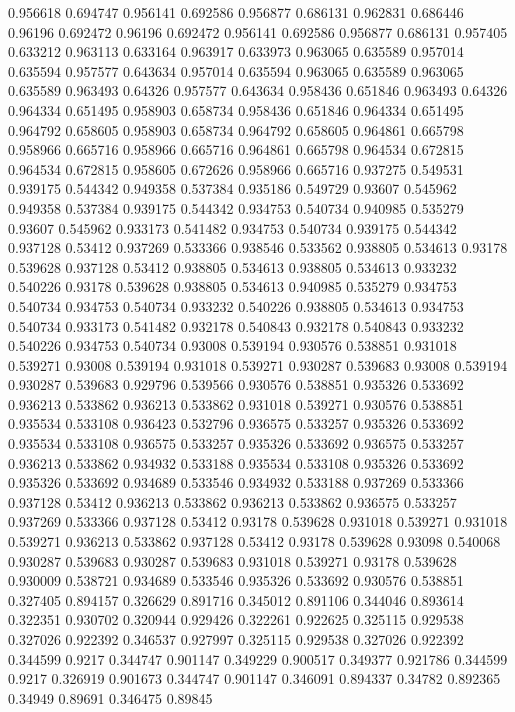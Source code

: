 0.956618 0.694747
0.956141 0.692586
0.956877 0.686131
0.962831 0.686446
0.96196 0.692472
0.96196 0.692472
0.956141 0.692586
0.956877 0.686131
0.957405 0.633212
0.963113 0.633164
0.963917 0.633973
0.963065 0.635589
0.957014 0.635594
0.957577 0.643634
0.957014 0.635594
0.963065 0.635589
0.963065 0.635589
0.963493 0.64326
0.957577 0.643634
0.958436 0.651846
0.963493 0.64326
0.964334 0.651495
0.958903 0.658734
0.958436 0.651846
0.964334 0.651495
0.964792 0.658605
0.958903 0.658734
0.964792 0.658605
0.964861 0.665798
0.958966 0.665716
0.958966 0.665716
0.964861 0.665798
0.964534 0.672815
0.964534 0.672815
0.958605 0.672626
0.958966 0.665716
0.937275 0.549531
0.939175 0.544342
0.949358 0.537384
0.935186 0.549729
0.93607 0.545962
0.949358 0.537384
0.939175 0.544342
0.934753 0.540734
0.940985 0.535279
0.93607 0.545962
0.933173 0.541482
0.934753 0.540734
0.939175 0.544342
0.937128 0.53412
0.937269 0.533366
0.938546 0.533562
0.938805 0.534613
0.93178 0.539628
0.937128 0.53412
0.938805 0.534613
0.938805 0.534613
0.933232 0.540226
0.93178 0.539628
0.938805 0.534613
0.940985 0.535279
0.934753 0.540734
0.934753 0.540734
0.933232 0.540226
0.938805 0.534613
0.934753 0.540734
0.933173 0.541482
0.932178 0.540843
0.932178 0.540843
0.933232 0.540226
0.934753 0.540734
0.93008 0.539194
0.930576 0.538851
0.931018 0.539271
0.93008 0.539194
0.931018 0.539271
0.930287 0.539683
0.93008 0.539194
0.930287 0.539683
0.929796 0.539566
0.930576 0.538851
0.935326 0.533692
0.936213 0.533862
0.936213 0.533862
0.931018 0.539271
0.930576 0.538851
0.935534 0.533108
0.936423 0.532796
0.936575 0.533257
0.935326 0.533692
0.935534 0.533108
0.936575 0.533257
0.935326 0.533692
0.936575 0.533257
0.936213 0.533862
0.934932 0.533188
0.935534 0.533108
0.935326 0.533692
0.935326 0.533692
0.934689 0.533546
0.934932 0.533188
0.937269 0.533366
0.937128 0.53412
0.936213 0.533862
0.936213 0.533862
0.936575 0.533257
0.937269 0.533366
0.937128 0.53412
0.93178 0.539628
0.931018 0.539271
0.931018 0.539271
0.936213 0.533862
0.937128 0.53412
0.93178 0.539628
0.93098 0.540068
0.930287 0.539683
0.930287 0.539683
0.931018 0.539271
0.93178 0.539628
0.930009 0.538721
0.934689 0.533546
0.935326 0.533692
0.930576 0.538851
0.327405 0.894157
0.326629 0.891716
0.345012 0.891106
0.344046 0.893614
0.322351 0.930702
0.320944 0.929426
0.322261 0.922625
0.325115 0.929538
0.327026 0.922392
0.346537 0.927997
0.325115 0.929538
0.327026 0.922392
0.344599 0.9217
0.344747 0.901147
0.349229 0.900517
0.349377 0.921786
0.344599 0.9217
0.326919 0.901673
0.344747 0.901147
0.346091 0.894337
0.34782 0.892365
0.34949 0.89691
0.346475 0.89845
